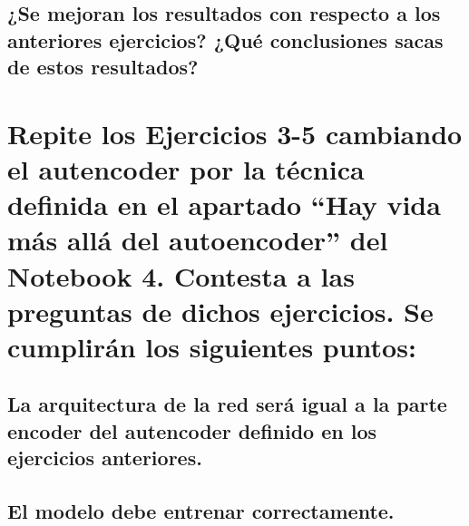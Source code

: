 \documentclass{article}
\begin{document}
\subsection{¿Se mejoran los resultados con respecto a los anteriores ejercicios? ¿Qué conclusiones sacas de estos resultados?}

\newpage
\section{Repite los Ejercicios 3-5 cambiando el autencoder por la técnica definida en el apartado ``Hay vida más allá del autoencoder'' del Notebook 4. Contesta a las preguntas de dichos ejercicios. Se cumplirán los siguientes puntos: }
\subsection{La arquitectura de la red será igual a la parte encoder del autencoder definido en los ejercicios anteriores.} 
\subsection{El modelo debe entrenar correctamente.}
\end{document}

